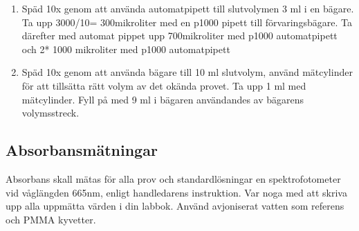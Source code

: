 \documentclass[./chem_exercises.tex]{subfiles}
\begin{document}
\begin{enumerate}
\item Späd 10x genom att använda automatpipett till slutvolymen 3 ml i en bägare.
Ta upp 3000/10= 300mikroliter med en p1000 pipett till förvaringsbägare.
Ta därefter med automat pippet upp 700mikroliter med p1000 automatpipett och
2* 1000 mikroliter med p1000 automatpipett

\item Späd 10x genom att använda bägare till 10 ml slutvolym, använd mätcylinder för att tillsätta
rätt volym av det okända provet.
Ta upp 1 ml med mätcylinder. Fyll på med 9 ml i bägaren användandes av bägarens volymsstreck.
\end{enumerate}
\subsection{Absorbansmätningar}

Absorbans skall mätas för alla prov och standardlösningar en spektrofotometer vid våglängden
665nm, enligt handledarens instruktion. Var noga med att skriva upp alla uppmätta värden i din
labbok. Använd avjoniserat vatten som referens och PMMA kyvetter.

\newpage











\end{document}
